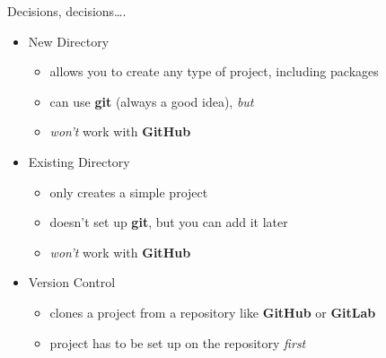 \documentclass[
  ignorenonframetext,
  aspectratio=169]{beamer}
\providecommand{\tightlist}{%
  \setlength{\itemsep}{0pt}\setlength{\parskip}{0pt}}
\begin{document}
\begin{frame}{Decisions, decisions\ldots.}
\protect\hypertarget{decisions-decisions.}{}
\begin{itemize}
\tightlist
\item
  New Directory

  \begin{itemize}
  \tightlist
  \item
    allows you to create any type of project, including packages
  \item
    can use \textbf{git} (always a good idea), \emph{but}
  \item
    \emph{won't} work with \textbf{GitHub}
  \end{itemize}
\item
  Existing Directory

  \begin{itemize}
  \tightlist
  \item
    only creates a simple project
  \item
    doesn't set up \textbf{git}, but you can add it later
  \item
    \emph{won't} work with \textbf{GitHub}
  \end{itemize}
\item
  Version Control

  \begin{itemize}
  \tightlist
  \item
    clones a project from a repository like \textbf{GitHub} or
    \textbf{GitLab}
  \item
    project has to be set up on the repository \emph{first}
  \end{itemize}
\end{itemize}
\end{frame}
\end{document}
